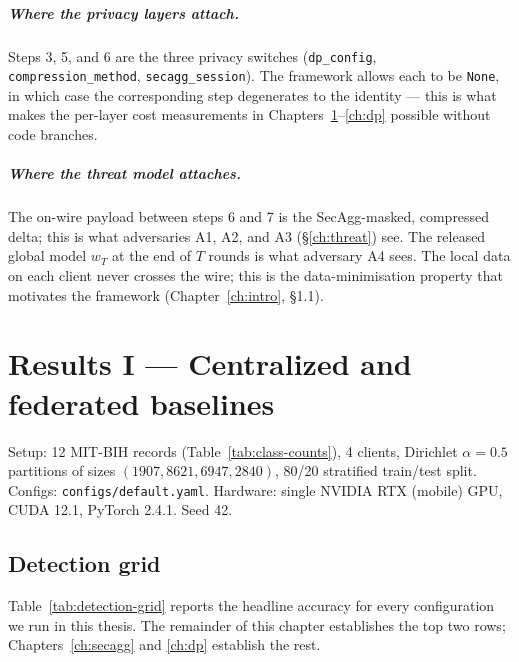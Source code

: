 \documentclass[11pt,a4paper]{report}
\begin{document}
\paragraph{Where the privacy layers attach.} Steps 3, 5, and 6 are the
three privacy switches (\texttt{dp\_config}, \texttt{compression\_method},
\texttt{secagg\_session}). The framework allows each to be
\texttt{None}, in which case the corresponding step degenerates to the
identity --- this is what makes the per-layer cost measurements in
Chapters~\ref{ch:detection}--\ref{ch:dp} possible without code branches.

\paragraph{Where the threat model attaches.} The on-wire payload between
steps 6 and 7 is the SecAgg-masked, compressed delta; this is what
adversaries A1, A2, and A3 (\S\ref{ch:threat}) see. The released global
model $w_T$ at the end of $T$ rounds is what adversary A4 sees. The
local data on each client never crosses the wire; this is the
data-minimisation property that motivates the framework
(Chapter~\ref{ch:intro}, \S1.1).

\chapter{Results I --- Centralized and federated baselines}\label{ch:detection}

Setup: 12 MIT-BIH records (Table~\ref{tab:class-counts}), 4 clients,
Dirichlet $\alpha = 0.5$ partitions of sizes $(1907, 8621, 6947, 2840)$,
80/20 stratified train/test split.
Configs: \texttt{configs/default.yaml}.
Hardware: single NVIDIA RTX (mobile) GPU, CUDA 12.1, PyTorch 2.4.1.
Seed 42.

\section{Detection grid}

Table~\ref{tab:detection-grid} reports the headline accuracy for every
configuration we run in this thesis. The remainder of this chapter establishes
the top two rows; Chapters~\ref{ch:secagg} and \ref{ch:dp} establish the rest.
\end{document}
